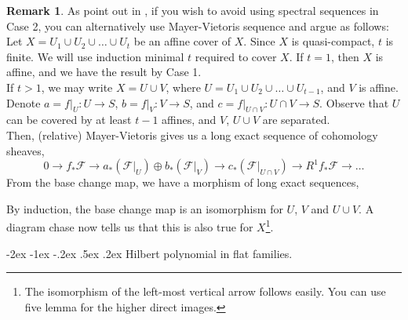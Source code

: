 \documentclass[11pt]{amsart}
\makeatletter
\renewcommand\subsection{\@startsection {subsection}{1}{\z@}%
	{-2ex \@plus -1ex \@minus -.2ex}%
	{.5ex \@plus.2ex}%
	{\normalfont\bfseries}}
\theoremstyle{definition}
\newtheorem{remark}[theorem]{Remark}
\makeatother
\begin{document}
\begin{remark}
	As point out in \cite[Tag 02KH]{stacks-project}, if you wish to avoid using spectral sequences in Case 2, you can alternatively use Mayer-Vietoris sequence and argue as follows:
	Let $X=U_1\cup U_2 \cup \ldots \cup U_t$ be an affine cover of $X$. Since $X$ is quasi-compact, $t$ is finite. We will use induction minimal $t$ required to cover $X$. If $t=1$, then $X$ is affine, and we have the result by Case 1. \\
	If $t>1$, we may write $X=U\cup V$, where $U=U_1\cup U_2 \cup \ldots \cup U_{t-1}$, and $V$ is affine. Denote $a = f|_U : U \to S$, $b = f|_V : V \to S$, and $c = f|_{U \cap V} : U \cap V \to S$. Observe that $U$ can be covered by at least $t-1$ affines, and $V$, $U\cup V$ are separated.\\
	Then, (relative) Mayer-Vietoris \cite[Tag 01EC]{stacks-project} gives us a long exact sequence of cohomology sheaves,
	\[0 \rightarrow
	f_*\mathcal{F} \rightarrow
	a_*(\mathcal{F}|_U) \oplus b_*(\mathcal{F}|_V) \rightarrow
	c_*(\mathcal{F}|_{U \cap V}) \rightarrow
	R^1f_*\mathcal{F} \to \ldots
	\]
	From the base change map, we have a morphism of long exact sequences,
	\begin{center}
	\end{center}
	By induction, the base change map is an isomorphism for $U$, $V$ and $U\cup V$. A diagram chase now tells us that this is also true for $X$\footnote{The isomorphism of the left-most vertical arrow follows easily. You can use five lemma for the higher direct images.}.
\end{remark}


\subsection{Hilbert polynomial in flat families.}
\end{document}
